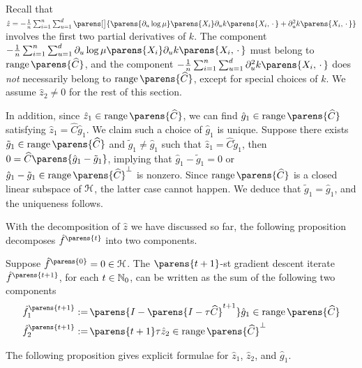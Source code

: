 Recall that $\hat{z} = - \frac{1}{n} \sum_{i=1}^n \sum_{u=1}^d \parens[\big]{\parens{\partial_u \log \mu} \parens{X_i} \partial_u k \parens{X_i, \,\cdot\,} + \partial_u^2 k \parens{X_i, \,\cdot\,}}$ involves the first two partial derivatives of $k$. The component $- \frac{1}{n} \sum_{i=1}^n \sum_{u=1}^d \partial_u \log \mu \parens{X_i} \partial_u k \parens{X_i, \,\cdot\,}$ must belong to $\range \parens{\widehat{C}}$, and the component $- \frac{1}{n} \sum_{i=1}^n \sum_{u=1}^d \partial_u^2 k \parens{X_i, \,\cdot\,}$ does \emph{not} necessarily belong to $\range \parens{\widehat{C}}$, except for special choices of $k$. We assume $\hat{z}_2 \neq 0$ for the rest of this section. 

In addition, since $\hat{z}_1 \in \range \parens{\widehat{C}}$, we can find $\hat{g}_1 \in \range \parens{\widehat{C}}$ satisfying $\hat{z}_1 = \widehat{C} \hat{g}_1$. We claim such a choice of $\hat{g}_1$ is unique. Suppose there exists $\tilde{g}_1 \in \range \parens{\widehat{C}}$ and $\tilde{g}_1 \neq \hat{g}_1$ such that $\hat{z}_1 = \widehat{C} \tilde{g}_1$, then $0 = \widehat{C} \parens{\hat{g}_1 - \tilde{g}_1}$, implying that $\hat{g}_1 - \tilde{g}_1 = 0$ or $\hat{g}_1 - \tilde{g}_1 \in \range \parens{\widehat{C}}^{\perp}$ is nonzero. Since $\range \parens{\widehat{C}}$ is a closed linear subspace of $\mathcal{H}$, the latter case cannot happen. We deduce that $\tilde{g}_1 = \hat{g}_1$, and the uniqueness follows. 

With the decomposition of $\hat{z}$ we have discussed so far, the following proposition decomposes $\hat{f}^{\parens{t}}$ into two components. %

\begin{proposition}\label{prop-decomposition-ft}
	Suppose $\hat{f}^{\parens{0}} = 0 \in \calH$. The $\parens{t+1}$-st gradient descent iterate $\hat{f}^{\parens{t+1}}$, for each $t \in \mathbb{N}_0$, can be written as the sum of the following two components 
	\begin{align*}
		\hat{f}_1^{\parens{t+1}} := & \,  \parens{I - \parens{I - \tau \widehat{C}}^{t+1}} \hat{g}_1 \in \range \parens{\widehat{C}}\\ 
		\hat{f}_2^{\parens{t+1}} := & \, \parens{t+1} \tau \hat{z}_2 \in \range \parens{\widehat{C}}^{\perp}
	\end{align*}
\end{proposition}

The following proposition gives explicit formulae for $\hat{z}_1$, $\hat{z}_2$, and $\hat{g}_1$. 


